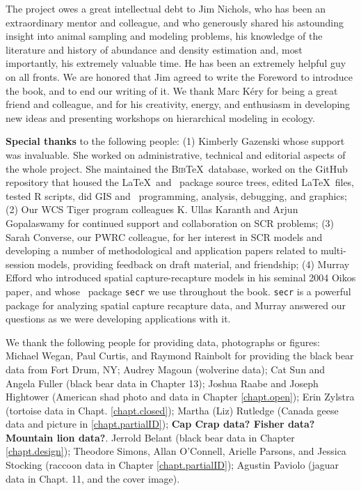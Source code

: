 
The project owes a great intellectual debt to Jim Nichols, who has
been an extraordinary mentor and colleague,
and who %
generously shared his
astounding insight into animal sampling and modeling problems, his
knowledge
of the literature and history of abundance and density estimation
and, most importantly, his extremely valuable time.
He has
been
an %
extremely helpful guy on all fronts. We are honored that Jim
agreed to write the Foreword to introduce the book, and to end our
writing of it.
 We thank Marc K\'{e}ry
for being a great friend and colleague, and for his creativity, %
energy, and enthusiasm in developing new ideas and
presenting workshops on hierarchical modeling in ecology.

{\bf Special thanks} to the following people: (1) Kimberly Gazenski whose support was
invaluable. She worked on administrative, technical and editorial
aspects of the whole project. She maintained the \textsc{Bib}\TeX~database,
worked on the GitHub repository that housed the \LaTeX~and \R~package
source trees, edited \LaTeX~files, tested R scripts, did GIS and
\R~programming, analysis, debugging, and graphics;  (2) Our WCS Tiger
program colleagues K. Ullas Karanth and Arjun Gopalaswamy for
continued support and collaboration on SCR problems;  (3) Sarah
Converse, our PWRC colleague, for her interest in SCR models and
developing a number of methodological and application papers related
to multi-session models, providing feedback on draft material, and
friendship;  (4) Murray Efford who introduced spatial
capture-recapture models %
in his seminal 2004 Oikos paper, and whose \R~package \mbox{\tt secr} we use
throughout the book.  \mbox{\tt secr} is a powerful package for analyzing
spatial capture recapture data, and Murray answered our questions as we
were developing applications with it.

We thank the following people for providing data, photographs or figures:
Michael Wegan, Paul Curtis, and Raymond Rainbolt for providing the black bear data from Fort Drum, NY;
Audrey Magoun (wolverine data); Cat Sun and Angela Fuller (black bear
data in Chapter 13); Joshua Raabe and Joseph Hightower (American shad
photo and data in Chapter \ref{chapt.open}); Erin Zylstra (tortoise
data in Chapt. \ref{chapt.closed}); Martha (Liz) Rutledge (Canada geese
data and picture in \ref{chapt.partialID});  {\bf Cap Crap data?
  Fisher data?  Mountain lion data?}.
Jerrold Belant (black bear data
in Chapter \ref{chapt.design}); Theodore Simons, Allan O'Connell,
Arielle Parsons, and Jessica Stocking (raccoon data in Chapter
\ref{chapt.partialID}); Agustin Paviolo (jaguar data in Chapt. 11, and
the cover image).

